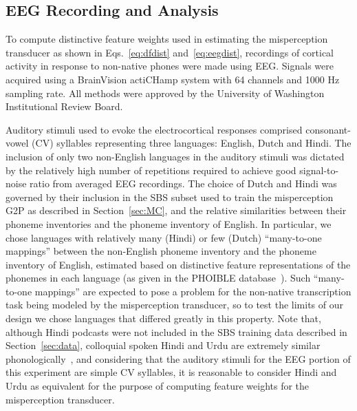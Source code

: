 \subsection{EEG Recording and Analysis}
To compute distinctive feature weights used in estimating the misperception
transducer as shown in Eqs.~\ref{eq:dfdist} and~\ref{eq:eegdist},
recordings of cortical activity in response to non-native phones were
made using EEG. Signals were acquired using a BrainVision actiCHamp 
system with 64 channels and 1000 Hz sampling rate.
All methods were approved by the University of Washington Institutional
Review Board.

Auditory stimuli used to evoke the electrocortical responses comprised
consonant-vowel (CV) syllables representing three languages: English,
Dutch and Hindi. The inclusion of only two non-English languages in the
auditory stimuli was dictated by the relatively high number of
repetitions required to achieve good signal-to-noise ratio from averaged
EEG recordings. The choice of Dutch and Hindi was governed by their
inclusion in the SBS subset used to train the misperception G2P as
described in Section~\ref{sec:MC}, and the relative similarities
between their phoneme inventories and the phoneme inventory of English.
In particular, we chose languages with relatively many (Hindi) or few
(Dutch) ``many-to-one mappings'' between the non-English phoneme
inventory and the phoneme inventory of English, estimated based on 
distinctive feature representations of the phonemes in each language 
(as given in the PHOIBLE database~\cite{PHOIBLE}). Such 
``many-to-one mappings'' are expected to pose a problem for the 
non-native transcription task being modeled by the misperception 
transducer, so to test the limits of our design we chose languages that 
differed greatly in this property. 
Note that, although Hindi podcasts were not included in the SBS training
data described in Section~\ref{sec:data}, colloquial spoken Hindi and
Urdu are extremely similar phonologically~\cite{Kachru90}, and
considering that the auditory stimuli for the EEG portion of this
experiment are simple CV syllables, it is reasonable to consider Hindi
and Urdu as equivalent for the purpose of computing feature weights for
the misperception transducer.


